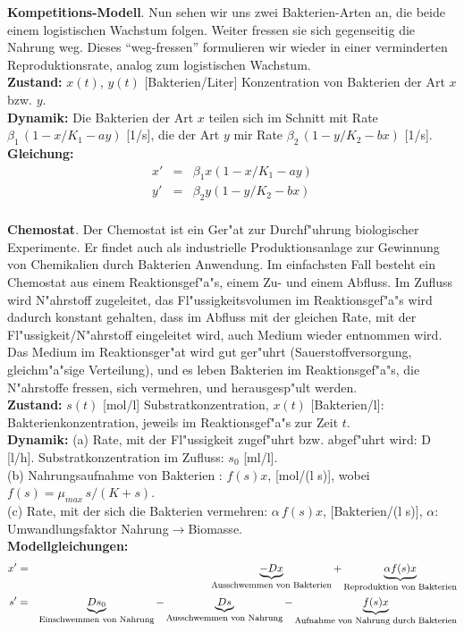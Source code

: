 \begin{bspX}  {\bf Kompetitions-Modell}. Nun sehen  wir uns zwei Bakterien-Arten an, die beide einem logistischen Wachstum folgen. Weiter fressen sie sich gegenseitig die Nahrung weg. Dieses ``weg-fressen'' formulieren wir wieder in 
einer verminderten Reproduktionsrate, analog zum logistischen Wachstum.\\
{\bf Zustand:} $x(t)$, $y(t)$ [Bakterien/Liter] Konzentration von Bakterien der Art $x$ bzw. $y$.\\
{\bf Dynamik:} Die Bakterien der Art $x$ teilen sich im Schnitt mit Rate $\beta_1\, (1-x/K_1-a y)$ [1/s], 
die der Art $y$ mir Rate  $\beta_2\, (1-y/K_2-b x)$ [1/s].\\
{\bf Gleichung:} 
\begin{eqnarray*}
x' & = & \beta_1 x (1-x/K_1-a y)\\
y' & = & \beta_2 y (1-y/K_2-b x)\\
\end{eqnarray*}
\end{bspX}

\begin{bspX}  {\bf Chemostat}. Der Chemostat ist ein Ger"at zur Durchf"uhrung 
biologischer Experimente. Er findet auch als industrielle Produktionsanlage zur 
Gewinnung von Chemikalien durch Bakterien Anwendung. Im einfachsten Fall besteht 
ein Chemostat aus einem Reaktionsgef"a"s, 
einem Zu- und einem Abfluss. Im Zufluss 
wird N"ahrstoff zugeleitet, das Fl"ussigkeitsvolumen im Reaktionsgef"a"s 
wird dadurch 
konstant gehalten, dass im Abfluss mit der gleichen Rate, mit der 
 Fl"ussigkeit/N"ahrstoff 
eingeleitet wird, auch Medium wieder entnommen wird. Das Medium im Reaktionsger"at 
wird gut ger"uhrt (Sauerstoffversorgung, gleichm"a"sige Verteilung), und es leben 
Bakterien im Reaktionsgef"a"s, die N"ahrstoffe fressen, sich vermehren, und 
herausgesp"ult werden.\\
{\bf Zustand:} $s(t)$ [mol/l] Substratkonzentration, $x(t)$ [Bakterien/l]: Bakterienkonzentration, jeweils im Reaktionsgef"a"s zur Zeit $t$.\\
{\bf Dynamik:} (a) Rate, mit der Fl"ussigkeit zugef"uhrt bzw. abgef"uhrt wird: D [l/h]. Substratkonzentration im Zufluss: $s_0$ [ml/l].\\
(b) Nahrungsaufnahme von Bakterien  : $f(s)x$, [mol/(l s)], wobei $f(s) = \mu_{max}\,s/(K+s)$.\\
(c) Rate, mit der sich die Bakterien vermehren: $\alpha\,f(s)x$, [Bakterien/(l s)],  $\alpha$: Umwandlungsfaktor Nahrung$\rightarrow$Biomasse.\\
{\bf Modellgleichungen:}\\
\begin{eqnarray*}
x' & = & \underbrace{-D x}_{\mbox{\footnotesize Ausschwemmen von Bakterien}} 
+  \underbrace{\alpha f(s) x}_{\mbox{\footnotesize Reproduktion von Bakterien}} \\
s'& =& 
 \underbrace{D s_0}_{\mbox{\footnotesize Einschwemmen von Nahrung}} 
-
\underbrace{D s}_{\mbox{\footnotesize Ausschwemmen von Nahrung}} 
-
 \underbrace{f(s) x}_{\mbox{\footnotesize Aufnahme von Nahrung durch Bakterien}} \\
\end{eqnarray*}
\end{bspX}

